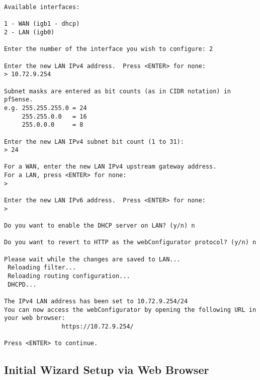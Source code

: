 \begin{enumerate}
\begin{verbatim}
Available interfaces:

1 - WAN (igb1 - dhcp)
2 - LAN (igb0)

Enter the number of the interface you wish to configure: 2

Enter the new LAN IPv4 address.  Press <ENTER> for none:
> 10.72.9.254

Subnet masks are entered as bit counts (as in CIDR notation) in pfSense.
e.g. 255.255.255.0 = 24
     255.255.0.0   = 16
     255.0.0.0     = 8

Enter the new LAN IPv4 subnet bit count (1 to 31):
> 24

For a WAN, enter the new LAN IPv4 upstream gateway address.
For a LAN, press <ENTER> for none:
> 

Enter the new LAN IPv6 address.  Press <ENTER> for none:
> 

Do you want to enable the DHCP server on LAN? (y/n) n

Do you want to revert to HTTP as the webConfigurator protocol? (y/n) n

Please wait while the changes are saved to LAN...
 Reloading filter...
 Reloading routing configuration...
 DHCPD...

The IPv4 LAN address has been set to 10.72.9.254/24
You can now access the webConfigurator by opening the following URL in your web browser:
                https://10.72.9.254/

Press <ENTER> to continue.
\end{verbatim}
\end{enumerate}

\subsection{Initial Wizard Setup via Web Browser}


